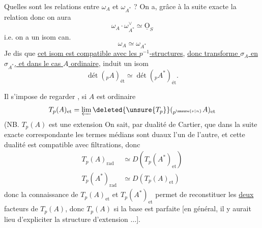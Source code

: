 Quelles sont les relations entre $\omega_A$ et $\omega_{A^*}$ ? On a, grâce à la suite exacte
la relation
donc on aura
\[
\omega_A\cdot\omega_{A^*}^\vee\simeq\underline{\mathrm O}_S
\]
i.e. on a un isom can.
\[
\omega_A\simeq\omega_{A^*}
\]
Je dis que \uline{cet isom est compatible avec les $p^{-1}$-structures}, \uline{donc transforme $\sigma_A$ en $\sigma_{A^*}$, et dans le cas $A$ ordinaire}, induit un isom
\[
\operatorname{dét}({}_pA)_{\text{ét}}\simeq\operatorname{dét}({}_pA^*)_{\text{ét}}.
\]

Il s'impose de regarder , si $A$ est ordinaire
\[
T_p(A)_{\text{et}}=\varprojlim\deleted{\unsure{T_p}}({}_{p^{\unsure{\nu|n}}}A)_{\text{et}}
\]
(NB. $T_p(A)$ est une extension
On sait, par dualité de Cartier, que dans la suite exacte correspondante
les termes médians sont duaux l'un de l'autre, et  cette dualité est compatible avec filtrations, donc
\[
\begin{aligned}
T_p(A)_{\mathrm{rad}}&\simeq D(T_p(A^*)_{\text{et}})\\
T_p(A^*)_{\mathrm{rad}}&\simeq D(T_p(A)_{\text{et}})
\end{aligned}
\]
donc la connaissance de $T_p(A)_{\text{et}}$ et $T_p(A^*)_{\text{et}}$ permet de reconstituer les \uline{deux} facteurs de $T_p(A)$, donc $T_p(A)$ si la base est parfaite [en général, il y aurait lieu d'expliciter la structure d'extension $\ldots$].

